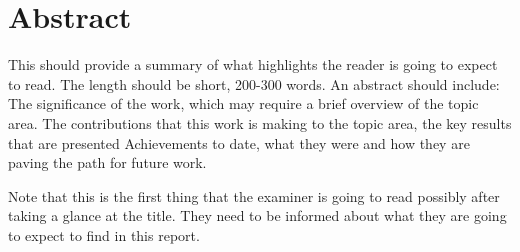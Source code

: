 \chapter*{Abstract}
This should provide a summary of what highlights the reader is going to expect to read. The length should be short, 200-300 words.
An abstract should include:
The significance of the work, which may require a brief overview of the topic area.
The contributions that this work is making to the topic area, the key results that are presented
Achievements to date, what they were and how they are paving the path for future work.

\noindent Note that this is the first thing that the examiner is going to read possibly after taking a glance at the title. They need to be informed about what they are going to expect to find in this report.
